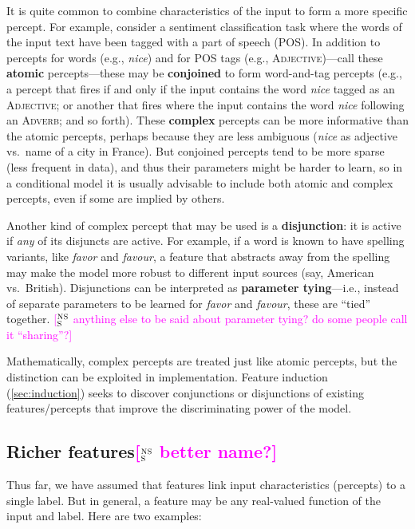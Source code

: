 \documentclass[11pt,letterpaper]{article}
\newcommand{\ensuretext}[1]{#1}
\newcommand{\nssmarker}{\ensuretext{\textcolor{magenta}{\ensuremath{^{\textsc{NS}}_{\textsc{S}}}}}}
\newcommand{\arkcomment}[3]{\ensuretext{\textcolor{#3}{[#1 #2]}}}
\newcommand{\nss}[1]{\arkcomment{\nssmarker}{#1}{magenta}}
\begin{document}
It is quite common to combine characteristics of the input to form a more specific percept.
For example, consider a sentiment classification task where the words of the input text have been 
tagged with a part of speech (POS). In addition to percepts for words (e.g., \textit{nice}) 
and for POS tags (e.g., \textsc{Adjective})---call these \textbf{atomic} percepts---these may be 
\textbf{conjoined} to form word-and-tag percepts (e.g., a percept that fires if and only if the input contains 
the word \textit{nice} tagged as an \textsc{Adjective}; or another that fires where the input contains 
the word \textit{nice} following an \textsc{Adverb}; and so forth).
These \textbf{complex} percepts can be more informative than the atomic percepts, 
perhaps because they are less ambiguous (\textit{nice} as adjective vs.~name of a city in France).
But conjoined percepts tend to be more sparse (less frequent in data), and thus their parameters might be harder to learn, 
so in a conditional model it is usually advisable to include both atomic and complex percepts, 
even if some are implied by others.

Another kind of complex percept that may be used is a \textbf{disjunction}: it is active if 
{\em any} of its disjuncts are active. For example, if a word is known to have spelling variants, 
like \textit{favor} and \textit{favour}, a feature that abstracts away from the spelling 
may make the model more robust to different input sources (say, American vs.~British).
Disjunctions can be interpreted as \textbf{parameter tying}---i.e., instead of separate parameters 
to be learned for \textit{favor} and \textit{favour}, these are ``tied'' together.
\nss{anything else to be said about parameter tying? do some people call it ``sharing''?}

Mathematically, complex percepts are treated just like atomic percepts, 
but the distinction can be exploited in implementation.
Feature induction (\cref{sec:induction}) seeks to discover conjunctions or disjunctions of 
existing features/percepts that improve the discriminating power of the model.


\subsection{Richer features\nss{better name?}}\label{sec:richer}

Thus far, we have assumed that features link input characteristics (percepts) 
to a single label. But in general, a feature may be any real-valued function of the input and label.
Here are two examples:
\end{document}
